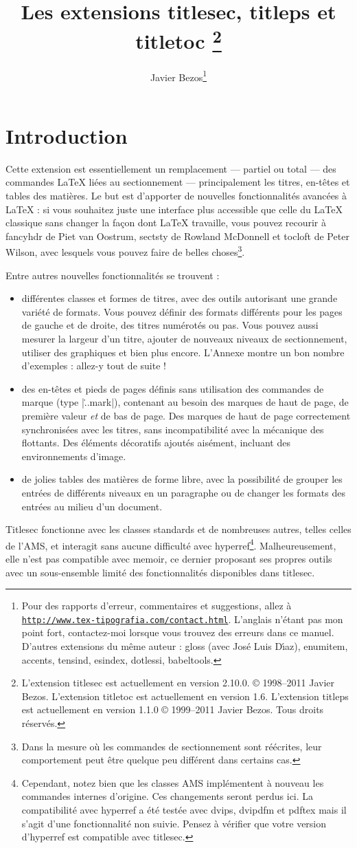 \documentclass[a4paper]{ltxguide}
\title{Les extensions \textsf{titlesec}, \textsf{titleps} et \textsf{titletoc} 
\footnote{L'extension \textsf{titlesec} est actuellement en version 2.10.0.  
\copyright{} 1998--2011 Javier Bezos. L'extension \textsf{titletoc} est actuellement 
en version 1.6. L'extension \textsf{titleps} est actuellement en version 1.1.0  
\copyright{} 1999--2011 Javier Bezos. Tous droits réservés.}}
\author{Javier Bezos\footnote{Pour des rapports d'erreur, commentaires et 
suggestions, allez à \href{http://www.tex-tipografia.com/contact.html}%
{\texttt{http://www.tex-tipografia.com/contact.html}}.  L'anglais n'étant pas mon 
point fort, contactez-moi lorsque vous trouvez des erreurs dans ce manuel.  
D'autres extensions du même auteur : \textsf{gloss} (avec
Jos\'e Luis D\'{\i}az), \textsf{enumitem, accents, tensind, esindex,
dotlessi, babeltools}.}}
\date{\docdate}
\begin{document}
\maketitle
\tableofcontents
\section{Introduction}

Cette extension est essentiellement un remplacement --- partiel ou total --- des 
commandes \LaTeX{} liées au sectionnement ---  principalement les titres, en-têtes et 
tables des matières. Le but est d'apporter de nouvelles fonctionnalités avancées à
 \LaTeX{} : si vous souhaitez juste une interface plus accessible 
que celle du \LaTeX{} classique sans changer la façon dont \LaTeX{} travaille, 
vous pouvez recourir à \textsf{fancyhdr} de Piet van Oostrum, \textsf{sectsty} de 
Rowland McDonnell et \textsf{tocloft} de Peter Wilson, avec lesquels vous pouvez 
faire de belles choses\footnote{Dans la mesure où les commandes de sectionnement 
sont réécrites, leur comportement peut être quelque peu différent dans certains 
cas.}.

Entre autres nouvelles fonctionnalités se trouvent :
\begin{itemize}
\item différentes classes et \og formes\fg{} de titres, avec des outils autorisant une 
grande variété de formats. Vous pouvez définir des formats différents pour les pages 
de gauche et de droite, des titres numérotés ou pas. Vous pouvez aussi mesurer la largeur 
d'un titre, ajouter de nouveaux niveaux de sectionnement, utiliser des graphiques et bien 
plus encore. L'Annexe montre un bon nombre d'exemples : allez-y tout de suite !

\item des en-têtes et pieds de pages définis sans utilisation des commandes de marque
(type |\...mark|), contenant au besoin des marques de haut de page, de première valeur 
\emph{et} de bas de page. Des marques de haut de page correctement synchronisées avec les 
titres, sans incompatibilité avec la mécanique des flottants. Des éléments 
décoratifs ajoutés aisément, incluant des environnements d'image.

\item de jolies tables des matières de forme libre, avec la possibilité de grouper les 
entrées de différents niveaux en un paragraphe ou de changer les formats des entrées 
au milieu d'un document. 
\end{itemize}
\textsf{Titlesec} fonctionne avec les classes standards et de nombreuses autres, 
telles celles de l'AMS, et interagit sans aucune difficulté avec 
\textsf{hyperref}\footnote{Cependant, notez bien que les classes AMS implémentent à 
nouveau les commandes internes d'origine. Ces changements seront perdus ici. La 
compatibilité avec \textsf{hyperref} a été testée avec \textsf{dvips}, 
\textsf{dvipdfm} et \textsf{pdftex} mais il s'agit d'une fonctionnalité non 
suivie. Pensez à vérifier que votre version d'\textsf{hyperref} est compatible 
avec \textsf{titlesec}.}. Malheureusement, elle n'est pas compatible avec 
\textsf{memoir}, ce dernier proposant ses propres outils avec un sous-ensemble limité 
des fonctionnalités disponibles dans \textsf{titlesec}.
\end{document}
